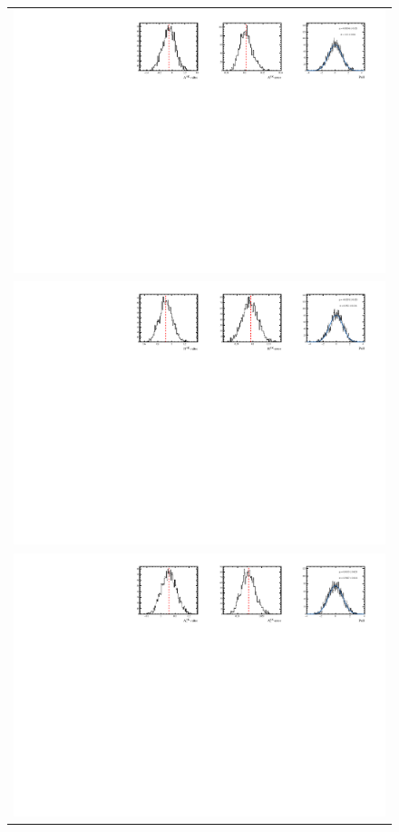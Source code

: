 \begin{figure}
  \centering
  \begin{tabular}{c}
\includegraphics[width=\textwidth]{ANA_resources/Plots/Data_fit/FitterBias//split//A_signal_KK.pdf} \\
\includegraphics[width=\textwidth]{ANA_resources/Plots/Data_fit/FitterBias//split//R_signal_KK.pdf} \\
\includegraphics[width=\textwidth]{ANA_resources/Plots/Data_fit/FitterBias//split//A_Bs_KK.pdf} \\

\end{tabular}
\end{figure}
